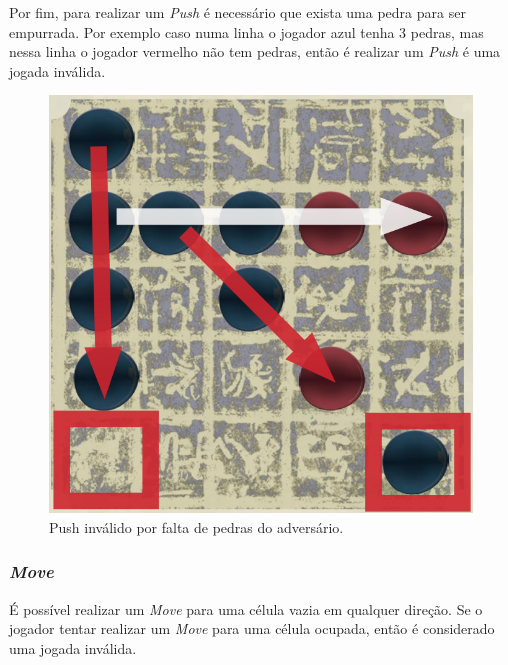 \documentclass[a4paper]{article}
\begin{document}
Por fim, para realizar um \textit{Push} é necessário que exista uma pedra para ser empurrada. Por exemplo caso numa linha o jogador azul tenha 3 pedras, mas nessa linha o jogador vermelho não tem pedras, então é realizar um  \textit{Push} é uma jogada inválida.

\begin{figure}[!htb]
	\centering
	\includegraphics[scale=0.3]{push2.png} 
	\caption{Push inválido por falta de pedras do adversário.}
\end{figure}

\subsubsection{\textit{Move}}

É possível realizar um  \textit{Move} para uma célula vazia em qualquer direção. Se o jogador tentar realizar um \textit{Move} para uma célula ocupada, então é considerado uma jogada inválida.
\end{document}
